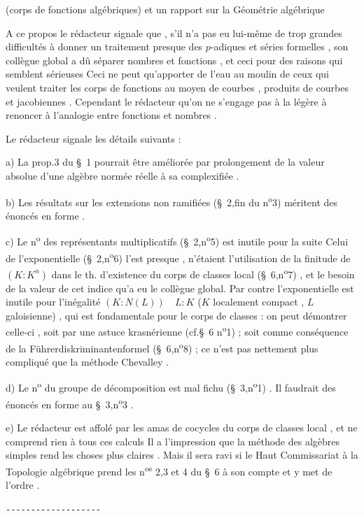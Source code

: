 (corps de fonctions algébriques) et un rapport sur la Géométrie algébrique

A ce propos le rédacteur signale que , s'il n'a pas eu lui-même de trop grandes difficultés à donner un traitement presque \textquotedbl{}\textquotedbl{} des $p$-adiques et séries formelles , son collègue global a dû séparer nombres et fonctions , et ceci pour des raisons qui semblent  sérieuses Ceci ne peut qu'apporter de l'eau au moulin de ceux qui veulent traiter les corps de fonctions au moyen de courbes , produits de courbes et jacobiennes . Cependant le rédacteur  qu'on ne s'engage pas à la légère à renoncer à l'analogie entre fonctions et nombres .

Le rédacteur signale les détails suivants :

a) La prop.3 du \S~1 pourrait être améliorée par prolongement de la valeur absolue d'une algèbre normée réelle à sa complexifiée .

b) Les résultats sur les extensions non ramifiées (\S~2,fin du n\textsuperscript{o}3) méritent des énoncés en forme .

c) Le n\textsuperscript{o} des représentants multiplicatifs (\S~2,n\textsuperscript{o}5) est inutile pour la suite Celui de l'exponentielle  (\S~2,n\textsuperscript{o}6) l'est presque , n'étaient l'utilisation de la finitude de $(K:K^{n})$ dans le th. d'existence du corps de classes local (\S~6,n\textsuperscript{o}7) , et le besoin de la valeur de cet indice qu'a eu le collègue global. Par contre l'exponentielle est inutile pour l'inégalité $(K:N(L))\quad L:K$ ($K$ localement compact , $L$ galoisienne) , qui est fondamentale pour le corps de classes : on peut démontrer celle-ci , soit par une astuce krasnérienne (cf.\S~6 n\textsuperscript{o}1) ; soit comme conséquence de la Führerdiskriminantenformel (\S~6,n\textsuperscript{o}8) ; ce n'est pas nettement plus compliqué que la méthode Chevalley .

d) Le n\textsuperscript{o} du groupe de décomposition est mal fichu (\S~3,n\textsuperscript{o}1) . Il faudrait des énoncés en forme au \S~3,n\textsuperscript{o}3 .

e) Le rédacteur est affolé par les amas de cocycles  du corps de classes local , et ne comprend rien à tous ces calculs \quad Il a l'impression que la méthode des algèbres simples rend les choses plus claires . Mais il sera ravi si le Haut Commissariat à la Topologie algébrique prend les  n\textsuperscript{os} 2,3 et 4 du \S~6 à son compte et y met de l'ordre .

\begin{center}\texttt{-{}-{}-{}-{}-{}-{}-{}-{}-{}-{}-{}-{}-{}-{}-{}-{}-{}-{}-}\end{center}
